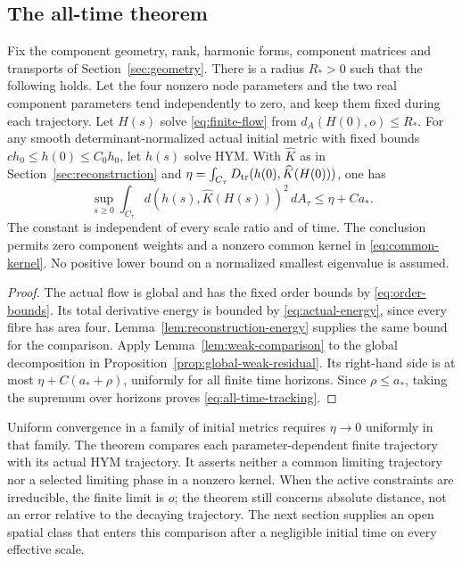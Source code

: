 \subsection{The all-time theorem}
\begin{theorem}\label{thm:all-time}
Fix the component geometry, rank, harmonic forms, component matrices
and transports of Section~\ref{sec:geometry}. There is a radius
$R_*>0$ such that the following holds. Let the four nonzero node
parameters and the two real component parameters tend independently
to zero, and keep them fixed during each trajectory. Let $H(s)$
solve \eqref{eq:finite-flow} from $d_A(H(0),o)\le R_*$.
For any smooth determinant-normalized actual initial metric with
fixed bounds $ch_0\le h(0)\le C_0h_0$, let $h(s)$ solve HYM.
With $\widehat K$ as in Section~\ref{sec:reconstruction} and
$\eta=\int_{C_\tau}D_{\operatorname{tr}}(h(0),\widehat K(H(0)))$, one has
\begin{equation}\label{eq:all-time-tracking}
 \sup_{s\ge0}\int_{C_\tau}
       d(h(s),\widehat K(H(s)))^2\,dA_\tau
                     \le\eta+C a_* .
\end{equation}
The constant is independent of every scale ratio and of time.
The conclusion permits zero component weights and a nonzero
common kernel in \eqref{eq:common-kernel}. No positive lower
bound on a normalized smallest eigenvalue is assumed.
\end{theorem}

\begin{proof}
The actual flow is global and has the fixed order bounds by
\eqref{eq:order-bounds}. Its total derivative energy is bounded
by \eqref{eq:actual-energy}, since every fibre has area four.
Lemma~\ref{lem:reconstruction-energy} supplies the same bound
for the comparison. Apply Lemma~\ref{lem:weak-comparison} to the
global decomposition in Proposition~\ref{prop:global-weak-residual}.
Its right-hand side is at most $\eta+C(a_*+\rho)$, uniformly for
all finite time horizons. Since $\rho\le a_*$, taking the supremum
over horizons proves \eqref{eq:all-time-tracking}.
\end{proof}

Uniform convergence in a family of initial metrics requires
$\eta\to0$ uniformly in that family. The theorem compares each
parameter-dependent finite trajectory with its actual HYM
trajectory. It asserts neither a common limiting trajectory nor
a selected limiting phase in a nonzero kernel. When the active
constraints are irreducible, the finite limit is $o$; the theorem
still concerns absolute distance, not an error relative to the
decaying trajectory. The next section supplies an open spatial
class that enters this comparison after a negligible initial
time on every effective scale.
